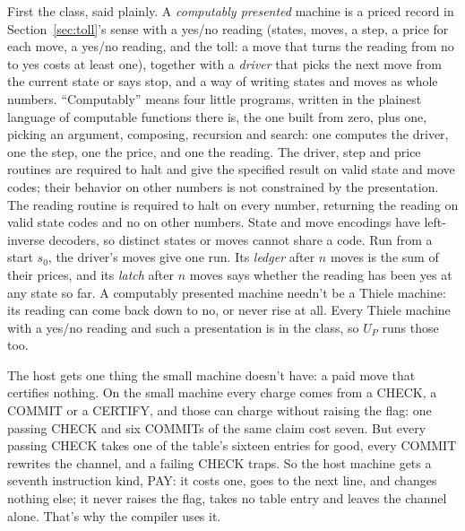 \documentclass[11pt,twoside]{article}
\theoremstyle{thielethm}
\theoremstyle{thieledef}
\theoremstyle{thieledef}
\theoremstyle{thieledef}
\theoremstyle{thielethm}
\theoremstyle{thieleobs}
\theoremstyle{thielethm}
\begin{document}
First the class, said plainly. A \emph{computably presented} machine is a priced record in
Section~\ref{sec:toll}'s sense with a yes/no reading (states, moves, a step, a price for each move, a
yes/no reading, and the toll: a move that turns the reading from no to yes costs at least one),
together with a \emph{driver} that picks the next move from the current state or says
stop, and a way of writing states and moves as whole numbers. ``Computably'' means four little
programs, written in the plainest language of computable functions there is, the one built from
zero, plus one, picking an argument, composing, recursion and search: one computes the driver,
one the step, one the price, and one the reading. The driver, step and price
routines are required to halt and give the specified result on valid state and move
codes; their behavior on other numbers is not constrained by the presentation.
The reading routine is required to halt on every number, returning the reading
on valid state codes and no on other numbers. State and move encodings have
left-inverse decoders, so distinct states or moves cannot share a code. Run from a start $s_0$, the driver's moves give one run. Its
\emph{ledger} after $n$ moves is the sum of their prices, and its \emph{latch} after $n$ moves
says whether the reading has been yes at any state so far. A computably presented machine needn't
be a Thiele machine: its reading can come back down to no, or never rise at all. Every Thiele
machine with a yes/no reading and such a presentation is in the class, so $U_P$ runs those too.

The host gets one thing the small machine doesn't have: a paid move that certifies nothing. On
the small machine every charge comes from a CHECK, a COMMIT or a CERTIFY, and those can charge
without raising the flag: one passing CHECK and six COMMITs of the same claim cost seven. But
every passing CHECK takes one of the table's sixteen entries for good, every COMMIT rewrites the
channel, and a failing CHECK traps. So the host machine gets a seventh instruction kind, PAY: it
costs one, goes to the next line, and changes nothing else; it never raises the flag, takes no
table entry and leaves the channel alone. That's why the compiler uses it.
\end{document}
